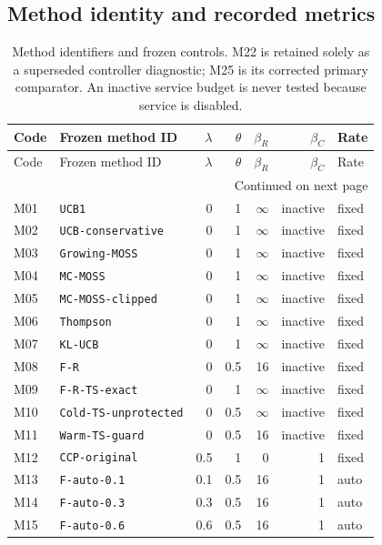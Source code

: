 \documentclass[11pt]{article}
\theoremstyle{remark}
\begin{document}
\subsection{Method identity and recorded metrics}
\begingroup
\fontsize{8}{10}\selectfont
\setlength{\tabcolsep}{4pt}
\begin{longtable}{llrrrrl}
\caption{Method identifiers and frozen controls. M22 is retained solely as a superseded controller diagnostic; M25 is its corrected primary comparator. An inactive service budget is never tested because service is disabled.}\label{tab:frozen-method-map}\\
\toprule
Code & Frozen method ID & $\lambda$ & $\theta$ & $\beta_R$ & $\beta_C$ & Rate \\
\midrule
\endfirsthead
\toprule
Code & Frozen method ID & $\lambda$ & $\theta$ & $\beta_R$ & $\beta_C$ & Rate \\
\midrule
\endhead
\midrule
\multicolumn{7}{r}{Continued on next page}\\
\endfoot
\bottomrule
\endlastfoot
M01 & \texttt{UCB1} & 0 & 1 & $\infty$ & inactive & fixed \\
M02 & \texttt{UCB-conservative} & 0 & 1 & $\infty$ & inactive & fixed \\
M03 & \texttt{Growing-MOSS} & 0 & 1 & $\infty$ & inactive & fixed \\
M04 & \texttt{MC-MOSS} & 0 & 1 & $\infty$ & inactive & fixed \\
M05 & \texttt{MC-MOSS-clipped} & 0 & 1 & $\infty$ & inactive & fixed \\
M06 & \texttt{Thompson} & 0 & 1 & $\infty$ & inactive & fixed \\
M07 & \texttt{KL-UCB} & 0 & 1 & $\infty$ & inactive & fixed \\
M08 & \texttt{F-R} & 0 & 0.5 & 16 & inactive & fixed \\
M09 & \texttt{F-R-TS-exact} & 0 & 1 & $\infty$ & inactive & fixed \\
M10 & \texttt{Cold-TS-unprotected} & 0 & 0.5 & $\infty$ & inactive & fixed \\
M11 & \texttt{Warm-TS-guard} & 0 & 0.5 & 16 & inactive & fixed \\
M12 & \texttt{CCP-original} & 0.5 & 1 & 0 & 1 & fixed \\
M13 & \texttt{F-auto-0.1} & 0.1 & 0.5 & 16 & 1 & auto \\
M14 & \texttt{F-auto-0.3} & 0.3 & 0.5 & 16 & 1 & auto \\
M15 & \texttt{F-auto-0.6} & 0.6 & 0.5 & 16 & 1 & auto \\

\end{longtable}
\end{document}
